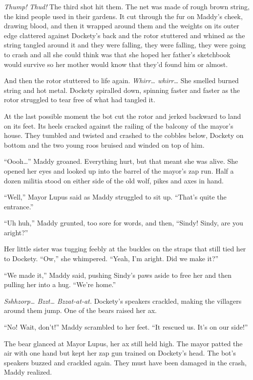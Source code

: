 \documentclass[10pt]{article}
\begin{document}
\emph{Thump!} \emph{Thud!} The third shot hit them. The net was made of
rough brown string, the kind people used in their gardens. It cut
through the fur on Maddy's cheek, drawing blood, and then it wrapped
around them and the weights on its outer edge clattered against
Dockety's back and the rotor stuttered and whined as the string tangled
around it and they were falling, they were falling, they were going to
crash and all she could think was that she hoped her father's sketchbook
would survive so her mother would know that they'd found him or almost.

And then the rotor stuttered to life again. \emph{Whirr\ldots{}
whirr\ldots{}} She smelled burned string and hot metal. Dockety
spiralled down, spinning faster and faster as the rotor struggled to
tear free of what had tangled it.

At the last possible moment the bot cut the rotor and jerked backward to
land on its feet. Its heels cracked against the railing of the balcony
of the mayor's house. They tumbled and twisted and crashed to the
cobbles below, Dockety on bottom and the two young roos bruised and
winded on top of him.

``Oooh\ldots{}'' Maddy groaned. Everything hurt, but that meant she was
alive. She opened her eyes and looked up into the barrel of the mayor's
zap run. Half a dozen militia stood on either side of the old wolf,
pikes and axes in hand.

``Well,'' Mayor Lupus said as Maddy struggled to sit up. ``That's quite
the entrance.''

``Uh huh,'' Maddy grunted, too sore for words, and then, ``Sindy! Sindy,
are you aright?''

Her little sister was tugging feebly at the buckles on the straps that
still tied her to Dockety. ``Ow,'' she whimpered. ``Yeah, I'm aright.
Did we make it?''

``We made it,'' Maddy said, pushing Sindy's paws aside to free her and
then pulling her into a hug. ``We're home.''

\emph{Sshhzorp\ldots{} Bzzt\ldots{} Bzzat-at-at.} Dockety's speakers
crackled, making the villagers around them jump. One of the bears raised
her ax.

``No! Wait, don't!'' Maddy scrambled to her feet. ``It rescued us. It's
on our side!''

The bear glanced at Mayor Lupus, her ax still held high. The mayor
patted the air with one hand but kept her zap gun trained on Dockety's
head. The bot's speakers buzzed and crackled again. They must have been
damaged in the crash, Maddy realized.
\end{document}

